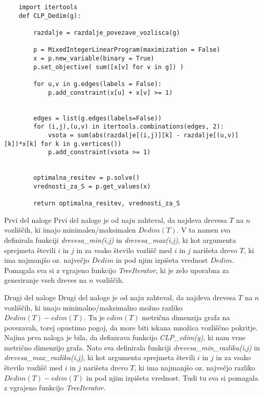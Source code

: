 \documentclass[12pt,a4paper]{amsart}
\makeatletter
\renewcommand\subsection{\@startsection{subsection}{2}%
  \z@{.5\linespacing\@plus.7\linespacing}{.5\linespacing}%
  {\normalfont\scshape}}
\theoremstyle{plain} %
\makeatother
\begin{document}
\begin{small}
    \begin{lstlisting}
    import itertools  
    def CLP_Dedim(g):

        razdalje = razdalje_povezave_vozlisca(g)

        p = MixedIntegerLinearProgram(maximization = False)
        x = p.new_variable(binary = True)
        p.set_objective( sum([x[v] for v in g]) )

        for u,v in g.edges(labels = False):
            p.add_constraint(x[u] + x[v] >= 1)


        edges = list(g.edges(labels=False))
        for (i,j),(u,v) in itertools.combinations(edges, 2):
            vsota = sum(abs(razdalje[(i,j)][k] - razdalje[(u,v)][k])*x[k] for k in g.vertices())
            p.add_constraint(vsota >= 1)


        optimalna_resitev = p.solve()
        vrednosti_za_S = p.get_values(x)

        return optimalna_resitev, vrednosti_za_S

    \end{lstlisting}
\end{small}

\bigskip

\subsection{Prvi del naloge}
Prvi del naloge je od naju zahteval, da najdeva drevesa $T$ na $n$ vozliščih, ki imajo minimalen/maksimalen $Dedim(T)$. V ta namen sva definirala funkciji \emph{drevesa\_min(i,j)} in \emph{drevesa\_max(i,j)}, 
ki kot argumenta sprejmeta števili $i$ in $j$ in za vsako število vozlišč med $i$ in $j$ narišeta drevo $T$, ki ima najmanjšo oz. največjo $Dedim$ in pod njim izpišeta vrednost $Dedim$. Pomagala sva si z vgrajeno funkcijo \emph{TreeIterator}, ki je zelo uporabna za generiranje vseh dreves na $n$ vozliščih.

\subsection{Drugi del naloge}
Drugi del naloge je od naju zahteval, da najdeva drevesa $T$ na $n$ vozliščih, ki imajo minimalno/maksimalno možno razliko $Dedim(T) - edim(T)$. Tu je $edim(T)$ metrična dimenzija grafa na povezavah, torej opustimo pogoj, da more biti iskana množica vozliščno pokritje. Najina prva naloga je bila, da definirava funkcijo \emph{CLP\_edim(g)}, ki nam vrne metrično dimenzijo grafa. Nato sva definirala funkciji \emph{drevesa\_min\_razlika(i,j)} in \emph{drevesa\_max\_razlika(i,j)}, 
ki kot argumenta sprejmeta števili $i$ in $j$ in za vsako število vozlišč med $i$ in $j$ narišeta drevo $T$, ki ima najmanjšo oz. največjo razliko $Dedim(T) - edim(T)$ in pod njim izpišeta vrednost. Tudi tu sva si pomagala z vgrajeno funkcijo \emph{TreeIterator}.
\end{document}
